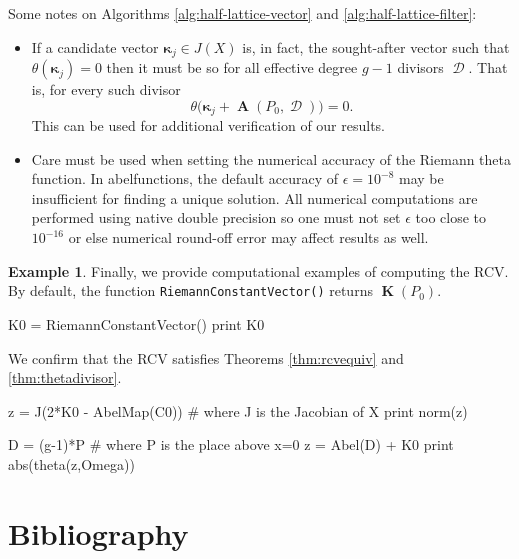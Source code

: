 \documentclass[12pt]{article}
\theoremstyle{definition}
\newtheorem{example}[theorem]{Example}
\DeclareMathOperator{\DivD}{\mathcal{D}}
\DeclareMathOperator{\RCV}{\boldsymbol{K}}
\DeclareMathOperator{\Abel}{\boldsymbol{A}}
\begin{document}
Some notes on Algorithms \ref{alg:half-lattice-vector} and
\ref{alg:half-lattice-filter}:
\begin{itemize}
  \item If a candidate vector $\boldsymbol{\kappa}_j \in J(X)$ is, in
    fact, the sought-after vector such that
    $\theta(\boldsymbol{\kappa}_j) = 0$ then it must be so for all
    effective degree $g-1$ divisors $\DivD$. That is, for every such
    divisor
    \begin{equation}
      \theta\big(\boldsymbol{\kappa}_j + \Abel(P_0,\DivD)\big) = 0.
    \end{equation}
    This can be used for additional verification of our results.
  \item Care must be used when setting the numerical accuracy of the
    Riemann theta function. In {\sc abelfunctions}, the default accuracy
    of $\epsilon = 10^{-8}$ may be insufficient for finding a unique
    solution. All numerical computations are performed using native
    double precision so one must not set $\epsilon$ too close to
    $10^{-16}$ or else numerical round-off error may affect results as
    well.
\end{itemize}
\begin{example}
Finally, we provide computational examples of computing the RCV. By
default, the function {\tt RiemannConstantVector()} returns $\RCV(P_0)$.
\begin{ipythoninput}
K0 = RiemannConstantVector()
print K0
\end{ipythoninput}
\begin{ipythonoutput}
[XXX]
\end{ipythonoutput}
We confirm that the RCV satisfies Theorems \ref{thm:rcvequiv} and
\ref{thm:thetadivisor}.
\begin{ipythoninput}
z = J(2*K0 - AbelMap(C0))    # where J is the Jacobian of X
print norm(z)
\end{ipythoninput}
\begin{ipythonoutput}
[XXX]
\end{ipythonoutput}
\begin{ipythoninput}
D = (g-1)*P    # where P is the place above x=0
z = Abel(D) + K0
print abs(theta(z,Omega))
\end{ipythoninput}
\begin{ipythonoutput}
[XXX]
\end{ipythonoutput}
\end{example}


\section{Bibliography}




\end{document}
